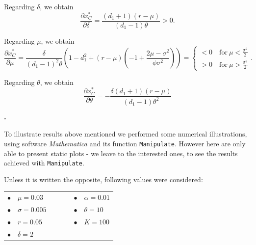 Regarding $\delta$, we obtain
$$\frac{\partial x^*_C}{\partial \delta}=\frac{(d_1+1) (r-\mu )}{(d_1-1) \theta }>0.$$

Regarding $\mu$, we obtain
$$\frac{\partial x^*_C}{\partial \mu}=\frac{\delta}{(d_1-1)^2 \theta} \left( 1-d_1^2 +(r-\mu)\left(-1+\frac{2\mu-\sigma^2}{\phi \sigma^2} \right) \right)= \begin{cases}
<0 \quad \text{for} \ \mu<\frac{\sigma^2}{2}\\
>0 \quad \text{for} \ \mu>\frac{\sigma^2}{2}
\end{cases}.$$


Regarding $\theta$, we obtain
$$\frac{\partial x^*_C}{\partial \theta}=-\frac{\delta  (d_1+1) (r-\mu )}{(d_1-1) \theta^2}$$

\begin{flushright}
 $\square$
\end{flushright}


To illustrate results above mentioned we performed some numerical illustrations, using software \textit{Mathematica} and its function \texttt{Manipulate}. However here are only able to present static plots - we leave to the interested ones, to see the results achieved with \texttt{Manipulate}.

Unless it is written the opposite, following values were considered:


\begin{table}[!htb]
	\centering
	\begin{tabular}{lllllll}
		 $\bullet$ & $\mu=0.03$     &  & \hspace{7cm} &  &  $\bullet$ & $\alpha=0.01$ \\
		 $\bullet$ & $\sigma=0.005$ &  & \hspace{7cm} &  &  $\bullet$ & $\theta=10$   \\
		 $\bullet$ & $r=0.05$       &  & \hspace{7cm} &  &  $\bullet$ & $K=100$       \\
		 $\bullet$ & $\delta=2$                                
	\end{tabular}
\end{table}



